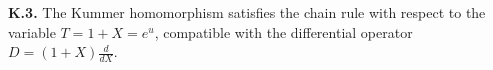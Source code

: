 \textbf{K.3.} The Kummer homomorphism satisfies the chain rule with respect to the variable $T = 1 + X = e^u$, compatible with the differential operator $D = (1+X)\frac{d}{dX}$.
